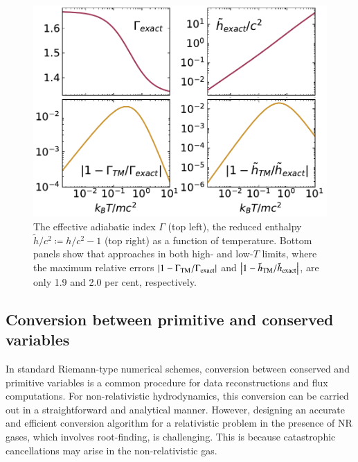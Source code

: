 \documentclass[twocolumn]{aastex63}
\begin{document}
\begin{figure}
	\includegraphics[width=\columnwidth]{compare_eos.pdf}
    \caption{The effective adiabatic index $\Gamma$ (top left), the reduced enthalpy $\tilde{h}/c^2\coloneqq h/c^2-1$ (top right) as a function of temperature. Bottom panels show that  approaches  in both high- and low-$T$ limits, where the maximum relative errors $\abs{1-\Gamma_{\text{TM}}/\Gamma_{\text{exact}}}$ and $\abs{1-\tilde{h}_{\text{TM}}/\tilde{h}_{\text{exact}}}$, are only 1.9 and 2.0 per cent, respectively.}
   \label{fig:compare_eos}
\end{figure}


\subsection{Conversion between primitive and conserved variables}
\label{section: Conversion between primitive variables and conserved ones}
In standard Riemann-type numerical schemes, conversion between conserved and primitive variables is a common procedure for data reconstructions and flux computations. For non-relativistic hydrodynamics, this conversion can be carried out in a straightforward and analytical manner. However, designing an accurate and efficient conversion algorithm for a relativistic problem in the presence of NR gases, which involves root-finding, is challenging. This is because catastrophic cancellations may arise in the non-relativistic gas.
\end{document}
